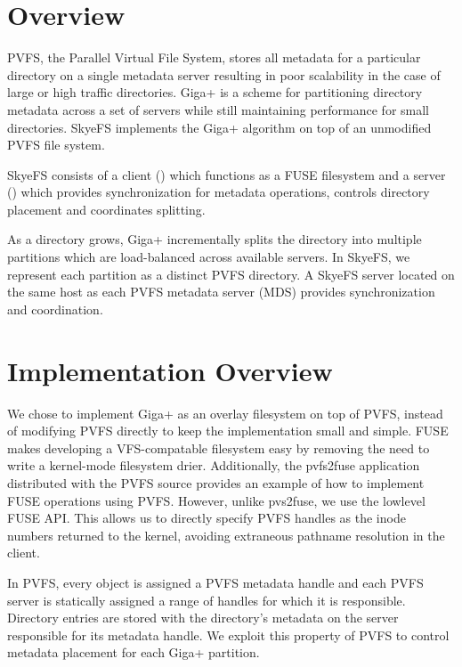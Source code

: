 \documentclass[onecolumn, 11pt, letterpaper]{article}
\begin{document}
\maketitle

\parindent 0.3in

\section{Overview}
PVFS, the Parallel Virtual File System, stores all metadata for a particular
directory on a single metadata server\cite{pvfs} resulting in poor scalability in the case
of large or high traffic directories.  Giga+ is a scheme for partitioning
directory metadata across a set of servers while still maintaining
performance for small directories.\cite{gigaplus}  SkyeFS implements the Giga+ algorithm on
top of an unmodified PVFS file system.

SkyeFS consists of a client () which functions as a
FUSE filesystem and a server () which provides
synchronization for metadata operations, controls directory placement and
coordinates splitting.\cite{fuse}  

As a directory grows, Giga+ incrementally splits the directory into multiple partitions which are
load-balanced across available servers.  In SkyeFS, we represent each
partition as a distinct PVFS directory.  A SkyeFS server located on the same
host as each
PVFS metadata server (MDS) provides synchronization and coordination.


\section{Implementation Overview}
We chose to implement Giga+ as an overlay filesystem on top of PVFS, instead
of modifying PVFS directly to keep the implementation small and
simple.  
FUSE makes developing a VFS-compatable filesystem easy by removing the need to
write a kernel-mode filesystem drier.
Additionally, the pvfs2\-fuse application distributed with the PVFS source
provides an example of how to implement FUSE operations using PVFS.  However,
unlike pvs2\-fuse, we use the lowlevel FUSE API.  This allows us to directly
specify PVFS handles as the inode numbers returned to the kernel, avoiding extraneous pathname
resolution in the client.

In PVFS, every object is assigned a PVFS metadata handle and each PVFS server
is statically assigned a range of handles for which it is responsible.  
Directory entries are stored with the directory's metadata
on the server responsible for its metadata handle.  We exploit this property
of PVFS to control metadata placement for each Giga+ partition.
\end{document}

